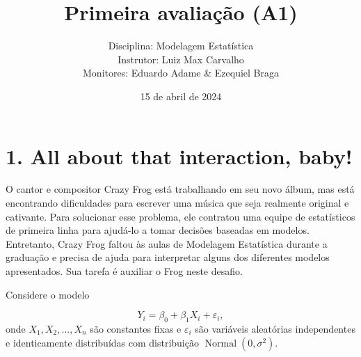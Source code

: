 \documentclass[a4paper,10pt, notitlepage]{report}
\title{Primeira avaliação (A1)}
\author{Disciplina: Modelagem Estatística \\ Instrutor: Luiz Max Carvalho \\ Monitores: Eduardo Adame \& Ezequiel Braga}
\date{15 de abril de 2024}
\begin{document}
\maketitle

\begin{center}
\end{center}
\thispagestyle{empty}
\newpage

\setcounter{page}{1}


\section*{1. All about that interaction, baby!}

O cantor e compositor Crazy Frog está trabalhando em seu novo álbum, mas está encontrando dificuldades para escrever uma música que seja realmente original e cativante. Para solucionar esse problema, ele contratou uma equipe de estatísticos de primeira linha para ajudá-lo a tomar decisões baseadas em modelos. Entretanto, Crazy Frog faltou às aulas de Modelagem Estatística durante a graduação e precisa de ajuda para interpretar alguns dos diferentes modelos apresentados. Sua tarefa é auxiliar o Frog neste desafio.

Considere o modelo

\begin{equation*}
    Y_i = \beta_0 + \beta_1 X_i + \varepsilon_i,
\end{equation*}
onde $X_1, X_2, \ldots, X_n$ são constantes fixas e $\varepsilon_i$ são variáveis aleatórias independentes e identicamente distribuídas com distribuição $\operatorname{Normal}(0, \sigma^2)$.
\end{document}
